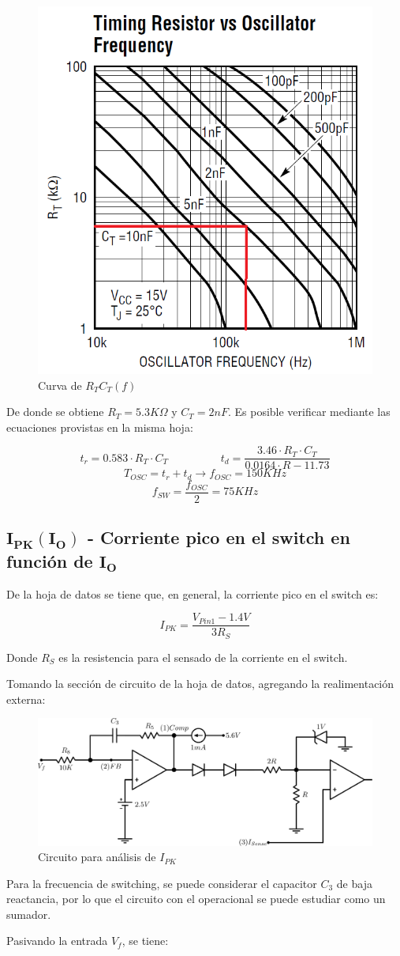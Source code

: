 \documentclass[e4_tp2_main.tex]{subfiles}
\begin{document}
\begin{figure}[H]
\centering
\includegraphics[width=0.3\linewidth]{Imagenes/Punto2/RT-OSC.png}
\caption{Curva de $R_TC_T(f)$}
\end{figure}

De donde se obtiene $R_T = 5.3K\Omega$ y $C_T = 2nF$. Es posible verificar mediante las ecuaciones provistas en la misma hoja:

\[
t_r = 0.583 \cdot R_T \cdot C_T \hspace{2cm} t_d = \frac{3.46 \cdot R_T \cdot C_T}{0.0164 \cdot R - 11.73}
\]
\[
T_{OSC} = t_r + t_d \longrightarrow f_{OSC} = 150KHz
\]
\[
f_{SW} = \frac{f_{OSC}}{2} = 75KHz
\]

\subsection*{$\mathbf{I_{PK}(I_O)}$ - Corriente pico en el switch en función de $\mathbf{I_O}$}
De la hoja de datos se tiene que, en general, la corriente pico en el switch es:

\[
I_{PK} = \frac{V_{Pin1} - 1.4V}{3R_S}
\]

Donde $R_S$ es la resistencia para el sensado de la corriente en el switch.

Tomando la sección de circuito de la hoja de datos, agregando la realimentación externa:

\begin{figure}[H]
\centering
\includegraphics[width=0.8\linewidth]{Imagenes/Punto2/IPK-Circuito.png}
\caption{Circuito para análisis de $I_{PK}$}
\end{figure}

Para la frecuencia de switching, se puede considerar el capacitor $C_3$ de baja reactancia, por lo que el circuito con el operacional se puede estudiar como un sumador.\par
Pasivando la entrada $V_{f}$, se tiene:
\end{document}
